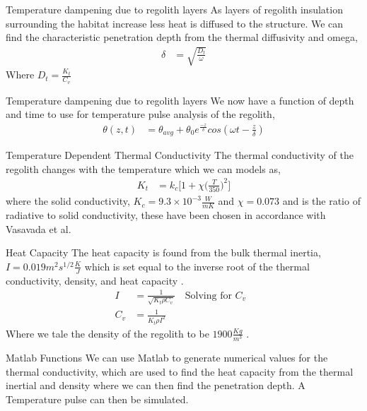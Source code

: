 \documentclass{beamer}
\begin{document}
  
\begin{frame}{Temperature dampening due to regolith layers }
As layers of regolith insulation surrounding the habitat increase less heat is diffused to the structure.  
We can find the characteristic penetration depth from the thermal diffusivity and omega,
\begin{align*}
\delta & = \sqrt{\frac{D_t}{\omega}}
\end{align*}
Where $D_t = \frac{K_t}{C_v}$

\end{frame}



  
\begin{frame}{Temperature dampening due to regolith layers }
We now have a function of depth and time to use for temperature pulse analysis of the regolith,
\begin{align*}
\theta(z,t) & = \theta_{avg}+\theta_0 e^{\frac{-z}{\delta}} cos(\omega t- \frac{z}{\delta})
\end{align*}

\end{frame}


\begin{frame}{Temperature Dependent Thermal Conductivity}
The thermal conductivity of the regolith changes with the temperature which we can models as,
\begin{align*}
K_t & = k_c \Bigg [ 1+\chi \bigg ( \frac{T}{350} \bigg )^2  \bigg ]
\end{align*}
where the solid conductivity, $K_c = 9.3\times 10^{-3} \frac{W}{mK}$ and $\chi= 0.073$ and is the ratio of radiative to solid conductivity, these have been chosen in accordance with Vasavada et al.\cite{Vasavada}
\end{frame}


\begin{frame}{Heat Capacity}
The heat capacity is found from the bulk thermal inertia, $I = 0.019 m^2 s^{1/2} \frac{K}{J}$ which is set equal to the inverse root of the thermal conductivity, density, and heat capacity \cite{Racca}. 
\begin{align*}
I & = \frac{1}{\sqrt{K_t \rho C_v}} \quad \text{Solving for $C_v$	}\\
C_v & = \frac{1}{K_t \rho I^2}
\end{align*}
Where we tale the density of the regolith to be $ 1900 \frac{Kg}{m^3} $ \cite{Malla}.
\end{frame}

\begin{frame}{Matlab Functions}
We can use Matlab to generate numerical values for the thermal conductivity, which are used to find the heat capacity from the thermal inertial and density where we can then find the penetration depth. A Temperature pulse can then be simulated.
\end{frame}
\end{document}
